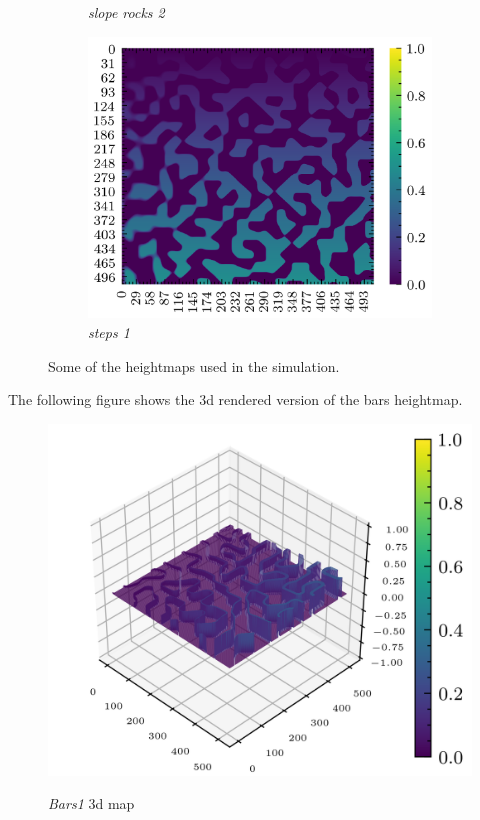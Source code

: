 \documentclass[../document.tex]{subfiles}
\begin{document}
\begin{figure}[H]
\begin{subfigure}[b]{0.3\textwidth}
			\caption{\emph{slope rocks 2}}
	    \end{subfigure}	
	   \begin{subfigure}[b]{0.3\textwidth}
			\includegraphics[width=\textwidth]{img/hm/steps1.png}
			\caption{\emph{steps 1}}
	    \end{subfigure}	
	\label{fig: heightmaps}
	\caption{Some of the heightmaps used in the simulation.}	
\end{figure}
The following figure shows the 3d rendered version of the bars heightmap.
\begin{figure}[H]
    \includegraphics[width=\textwidth]{img/hm3d/bars1.png}
	\label{fig: bars1-3d}
	\caption{\emph{Bars1} 3d map}
\end{figure}
\end{document}

